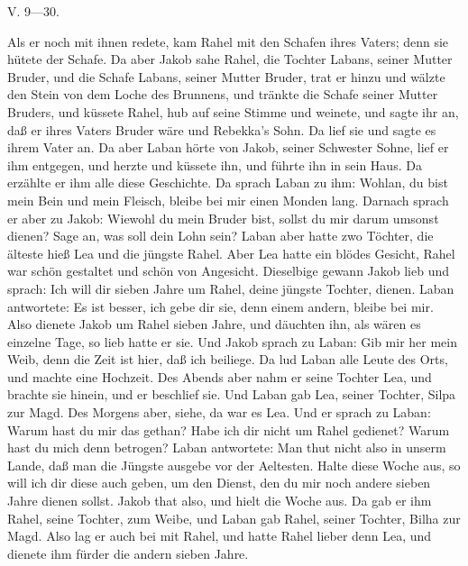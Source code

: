 \begin{schriftzitat}
V. 9—30.

Als er noch mit ihnen redete, kam Rahel mit den Schafen ihres Vaters; denn sie hütete der Schafe. Da aber Jakob sahe Rahel, die Tochter Labans, seiner Mutter Bruder, und die Schafe Labans, seiner Mutter Bruder, trat er hinzu und wälzte den Stein von dem Loche des Brunnens, und tränkte die Schafe seiner Mutter Bruders, und küssete Rahel, hub auf seine Stimme und weinete, und sagte ihr an, daß er ihres Vaters Bruder wäre und Rebekka’s Sohn. Da lief sie und sagte es ihrem Vater an. Da aber Laban hörte von Jakob, seiner Schwester Sohne, lief er ihm entgegen, und herzte und küssete ihn, und führte ihn in sein Haus. Da erzählte er ihm alle diese Geschichte. Da sprach Laban zu ihm: Wohlan, du bist mein Bein und mein Fleisch, bleibe bei mir einen Monden lang. Darnach sprach er aber zu Jakob: Wiewohl du mein Bruder bist, sollst du mir darum umsonst dienen? Sage an, was soll dein Lohn sein? Laban aber hatte zwo Töchter, die älteste hieß Lea und die jüngste Rahel. Aber Lea hatte ein blödes Gesicht, Rahel war schön gestaltet und schön von Angesicht. Dieselbige gewann Jakob lieb und sprach: Ich will dir sieben
Jahre um Rahel, deine jüngste Tochter, dienen. Laban antwortete: Es ist besser, ich gebe dir sie, denn einem andern, bleibe bei mir. Also dienete Jakob um Rahel sieben Jahre, und däuchten ihn, als wären es einzelne Tage, so lieb hatte er sie. Und Jakob sprach zu Laban: Gib mir her mein Weib, denn die Zeit ist hier, daß ich beiliege. Da lud Laban alle Leute des Orts, und machte eine Hochzeit. Des Abends aber nahm er seine Tochter Lea, und brachte sie hinein, und er beschlief sie. Und Laban gab Lea, seiner Tochter, Silpa zur Magd. Des Morgens aber, siehe, da war es Lea. Und er sprach zu Laban: Warum hast du mir das gethan? Habe ich dir nicht um Rahel gedienet? Warum hast du mich denn betrogen? Laban antwortete: Man thut nicht also in unserm Lande, daß man die Jüngste ausgebe vor der Aeltesten. Halte diese Woche aus, so will ich dir diese auch geben, um den Dienst, den du mir noch andere sieben Jahre dienen sollst. Jakob that also, und hielt die Woche aus. Da gab er ihm Rahel, seine Tochter, zum Weibe, und Laban gab Rahel, seiner Tochter, Bilha zur Magd. Also lag er auch bei mit Rahel, und hatte Rahel lieber denn Lea, und dienete ihm fürder die andern sieben Jahre.
\end{schriftzitat}

